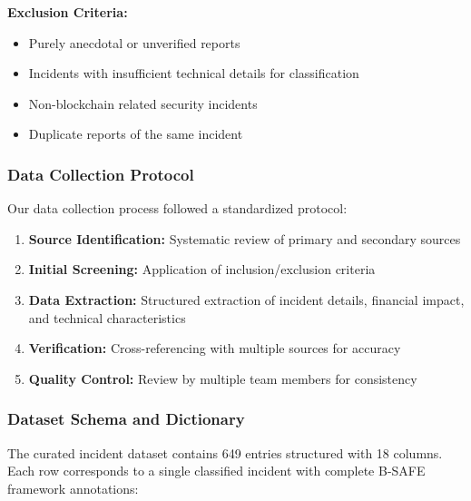 \textbf{Exclusion Criteria:}
\begin{itemize}
    \item Purely anecdotal or unverified reports
    \item Incidents with insufficient technical details for classification
    \item Non-blockchain related security incidents
    \item Duplicate reports of the same incident
\end{itemize}

\subsubsection{Data Collection Protocol}
Our data collection process followed a standardized protocol:
\begin{enumerate}
    \item \textbf{Source Identification:} Systematic review of primary and secondary sources
    \item \textbf{Initial Screening:} Application of inclusion/exclusion criteria
    \item \textbf{Data Extraction:} Structured extraction of incident details, financial impact, and technical characteristics
    \item \textbf{Verification:} Cross-referencing with multiple sources for accuracy
    \item \textbf{Quality Control:} Review by multiple team members for consistency
\end{enumerate}

\subsubsection{Dataset Schema and Dictionary}

The curated incident dataset contains 649 entries structured with 18 columns. Each row corresponds to a single classified incident with complete B-SAFE framework annotations:

